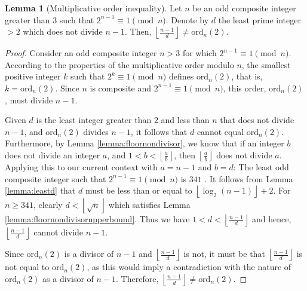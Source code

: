 \documentclass{article}
\theoremstyle{plain}
\theoremstyle{definition}
\newtheorem{lemma}{Lemma}
\newcommand{\ordn}[1]{\text{ord}_n\left({#1}\right)}
\begin{document}
\begin{lemma}[Multiplicative order inequality] \label{lemma:orderinequality}
Let \( n \) be an odd composite integer greater than 3 such that \( 2^{n-1} \equiv 1 \pmod{n} \). Denote by \( d \) the least prime integer \( > 2 \) which does not divide \( n-1 \). Then, \( \left\lfloor\frac{n-1}{d}\right\rfloor \not= \ordn{2} \).
\end{lemma}
\begin{proof}
Consider an odd composite integer \( n > 3 \) for which \( 2^{n-1} \equiv 1 \pmod{n} \). According to the properties of the multiplicative order modulo $n$, the smallest positive integer \( k \) such that \( 2^k \equiv 1 \pmod{n} \) defines \( \ordn{2} \), that is, \( k = \ordn{2} \). Since $n$ is composite and \( 2^{n-1} \equiv 1 \pmod{n} \), this order, \( \ordn{2} \), must divide \( n-1 \).

Given \( d \) is the least integer greater than $2$ and less than \( n \) that does not divide \( n-1 \), and \( \ordn{2} \) divides \( n-1 \), it follows that $d$ cannot equal \( \ordn{2} \). Furthermore, by Lemma \ref{lemma:floornondivisor}, we know that if an integer \( b \) does not divide an integer \( a \), and \( 1 < b < \left\lfloor \frac{a}{b} \right\rfloor \), then \( \left\lfloor \frac{a}{b} \right\rfloor \) does not divide \( a \). Applying this to our current context with \( a = n-1 \) and \( b = d \): The least odd composite integer such that \( 2^{n-1} \equiv 1 \pmod{n} \) is $341$ \cite{oeisfermatpspbase2}. It follows from Lemma \ref{lemma:leastd} that $d$ must be less than or equal to $\left\lfloor\log_2(n-1)\right\rfloor + 2$. For $n \geq 341$, clearly $d < \left\lfloor\sqrt{n}\right\rfloor$ which satisfies Lemma \ref{lemma:floornondivisorupperbound}. Thus we have \( 1 < d < \left\lfloor \frac{n-1}{d} \right\rfloor \) and hence, \( \left\lfloor \frac{n-1}{d} \right\rfloor \) cannot divide \( n-1 \).

Since \( \ordn{2} \) is a divisor of \( n-1 \) and \( \left\lfloor \frac{n-1}{d} \right\rfloor \) is not, it must be that \( \left\lfloor \frac{n-1}{d} \right\rfloor \) is not equal to \( \ordn{2} \), as this would imply a contradiction with the nature of \( \ordn{2} \) as a divisor of \( n-1 \). Therefore, \( \left\lfloor\frac{n-1}{d}\right\rfloor \not= \ordn{2} \).
\end{proof}
\end{document}
